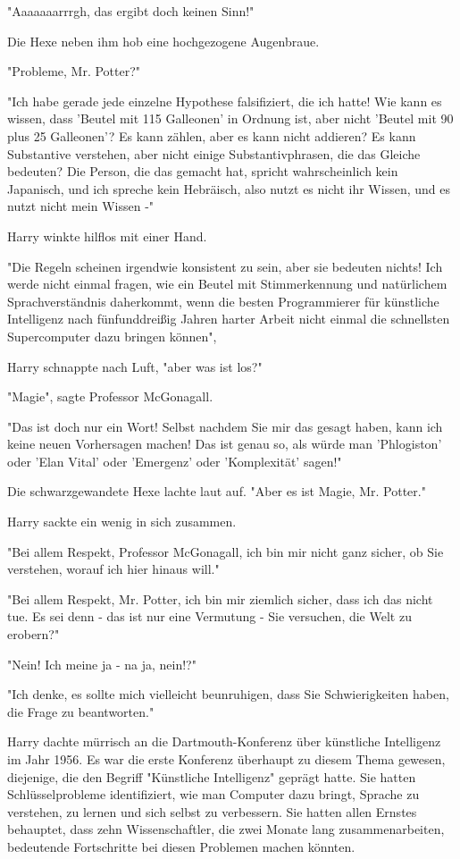 {"Aaaaaaarrrgh, das ergibt doch keinen Sinn!"

Die Hexe neben ihm hob eine hochgezogene Augenbraue.

"Probleme, Mr. Potter?"

"Ich habe gerade jede einzelne Hypothese falsifiziert, die ich hatte! Wie kann es wissen, dass 'Beutel mit 115 Galleonen' in Ordnung ist, aber nicht 'Beutel mit 90 plus 25 Galleonen'? Es kann zählen, aber es kann nicht addieren? Es kann Substantive verstehen, aber nicht einige Substantivphrasen, die das Gleiche bedeuten? Die Person, die das gemacht hat, spricht wahrscheinlich kein Japanisch, und ich spreche kein Hebräisch, also nutzt es nicht ihr Wissen, und es nutzt nicht mein Wissen -"

Harry winkte hilflos mit einer Hand.

"Die Regeln scheinen irgendwie konsistent zu sein, aber sie bedeuten nichts! Ich werde nicht einmal fragen, wie ein Beutel mit Stimmerkennung und natürlichem Sprachverständnis daherkommt, wenn die besten Programmierer für künstliche Intelligenz nach fünfunddreißig Jahren harter Arbeit nicht einmal die schnellsten Supercomputer dazu bringen können",

Harry schnappte nach Luft, "aber was ist los?"

"Magie", sagte Professor McGonagall.

"Das ist doch nur ein Wort! Selbst nachdem Sie mir das gesagt haben, kann ich keine neuen Vorhersagen machen! Das ist genau so, als würde man 'Phlogiston' oder 'Elan Vital' oder 'Emergenz' oder 'Komplexität' sagen!"

Die schwarzgewandete Hexe lachte laut auf. "Aber es ist Magie, Mr. Potter."

Harry sackte ein wenig in sich zusammen.

"Bei allem Respekt, Professor McGonagall, ich bin mir nicht ganz sicher, ob Sie verstehen, worauf ich hier hinaus will."

"Bei allem Respekt, Mr. Potter, ich bin mir ziemlich sicher, dass ich das nicht tue. Es sei denn - das ist nur eine Vermutung - Sie versuchen, die Welt zu erobern?"

"Nein! Ich meine ja - na ja, nein!?"

"Ich denke, es sollte mich vielleicht beunruhigen, dass Sie Schwierigkeiten haben, die Frage zu beantworten."

Harry dachte mürrisch an die Dartmouth-Konferenz über künstliche Intelligenz im Jahr 1956. Es war die erste Konferenz überhaupt zu diesem Thema gewesen, diejenige, die den Begriff "Künstliche Intelligenz" geprägt hatte. Sie hatten Schlüsselprobleme identifiziert, wie man Computer dazu bringt, Sprache zu verstehen, zu lernen und sich selbst zu verbessern. Sie hatten allen Ernstes behauptet, dass zehn Wissenschaftler, die zwei Monate lang zusammenarbeiten, bedeutende Fortschritte bei diesen Problemen machen könnten.

}
